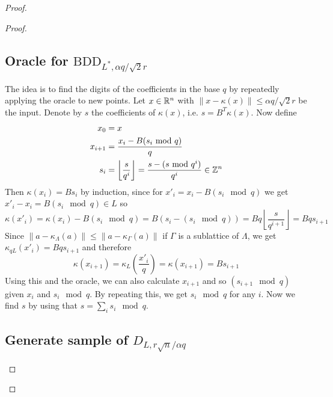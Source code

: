 \begin{proof}
\begin{proof}
\subsection{Oracle for $\mathrm{BDD}_{L^*, \alpha q / \sqrt{2}r}$}
The idea is to find the digits of the coefficients in the base $q$ by repeatedly applying the oracle to new points. Let $x \in \mathbb{R}^n$ with $\| x - \kappa(x) \| \leq \alpha q/\sqrt{2}r$ be the input. Denote by $s$ the coefficients of $\kappa(x)$, i.e. $s = B^T \kappa(x)$. Now define
\begin{equation}
\begin{split}
x_0 &= x \\
x_{i + 1} &= \frac {x_i - B (s_i \text{ mod } q)} q \\
s_{i} &= \left\lfloor \frac s {q^i} \right\rfloor = \frac {s - (s \text{ mod } q^i)} {q^i} \in \mathbb{Z}^n \nonumber
\end{split}
\end{equation}
Then $\kappa(x_i) = Bs_i$ by induction, since for $x'_i = x_i - B (s_i \mod q)$ we get $x'_i - x_i = B (s_i \mod q) \in L$ so
\begin{equation}
\kappa(x'_i)  = \kappa(x_i) - B(s_i \mod q) = B\left(s_i - (s_i \mod q)\right) = B q \left\lfloor \frac s {q^{i + 1}} \right\rfloor = Bqs_{i + 1} \nonumber
\end{equation}
Since $\| a - \kappa_\Lambda(a) \| \leq \| a - \kappa_\Gamma(a) \|$ if $\Gamma$ is a sublattice of $\Lambda$, we get $\kappa_{qL}(x'_i) = Bqs_{i+1}$ and therefore
\begin{equation}
\kappa(x_{i + 1}) = \kappa_L\left(\frac {x'_i} q\right)  = \kappa(x_{i + 1}) = Bs_{i + 1} \nonumber
\end{equation}
Using this and the oracle, we can also calculate $x_{i + 1}$ and so $(s_{i + 1} \mod q)$ given $x_i$ and $s_i \mod q$. By repeating this, we get $s_i \mod q$ for any $i$. Now we find $s$ by using that $s = \sum_i s_i \mod q$.

\subsection{Generate sample of $D_{L, r\sqrt{n}/\alpha q}$}

\end{proof}
\end{proof}
